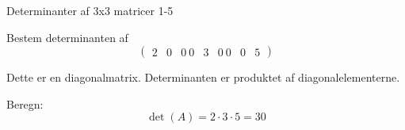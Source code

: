 \documentclass{article}
\begin{document}
\newpage

\begin{exercise}{Determinanter af 3x3 matricer 1-5}

Bestem determinanten af
\[
\begin{pmatrix}
2 & 0 & 0 \
0 & 3 & 0 \
0 & 0 & 5
\end{pmatrix}
\]


\hint

Dette er en diagonalmatrix. Determinanten er produktet af diagonalelementerne.

\hint

Beregn:
\[
\det(A) = 2 \cdot 3 \cdot 5 = 30
\]

\end{exercise}
\end{document}
